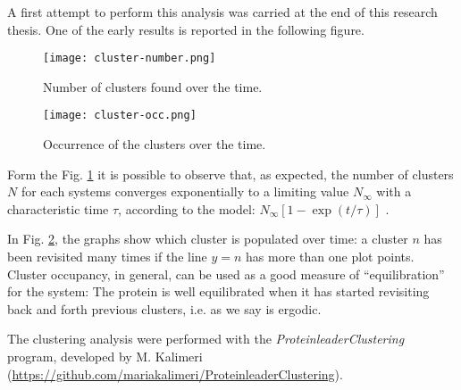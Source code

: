 
A first attempt to perform this analysis was carried at the end of this research thesis. One of the early results is reported in the following figure. 
\begin{figure}[H]
\centering
\begin{minipage}[t]{0.9\textwidth}
	\centering
    \texttt{[image: cluster-number.png]}
    
    \footnotesize{\caption{Number of clusters found over the time.}
    \label{img:cluster-n}
    }
\end{minipage} 
\end{figure}

\begin{figure}[H]
\centering
\begin{minipage}[t]{0.9\textwidth}
	\centering
    \texttt{[image: cluster-occ.png]}
    
    \footnotesize{\caption{Occurrence of the clusters over the time.}
    \label{img:cluster-occ}
    }
\end{minipage} 
\end{figure}

Form the Fig. \ref{img:cluster-n} it is possible to observe that, as expected, the number of clusters $N$ for each systems converges exponentially to a limiting value $N_\infty$ with a characteristic time $\tau$, according to the model: $N_\infty [1 - \exp(t/\tau)]$ \cite{kalimeri2013conformational}.

In Fig. \ref{img:cluster-occ}, the graphs show which cluster is populated over time: a cluster $n$ has been revisited many times if the line $y = n$ has more than one plot points. Cluster occupancy, in general, can be used as a good measure of ``equilibration'' for the system: The protein is well equilibrated when it has started revisiting back and forth previous clusters, i.e. as we say is ergodic.

The clustering analysis were performed with the \textit{ProteinleaderClustering} program, developed by M. Kalimeri (\url{https://github.com/mariakalimeri/ProteinleaderClustering}).


